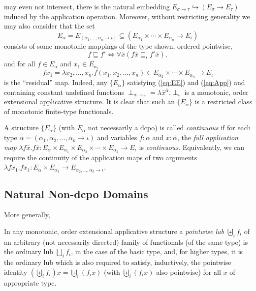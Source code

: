 \documentclass[fleqn]{LMCS}
\theoremstyle{plain}\newtheorem{satz}[thm]{Satz}
\theoremstyle{plain}\newtheorem{hyp}[thm]{Hypothesis}
\theoremstyle{plain}\newtheorem{hyps}[thm]{Hypotheses}
\theoremstyle{definition}\newtheorem{note}[thm]{Note}
\newcommand{\setof}[1]{\{#1\}}
\newcommand{\pointwiselub}{\biguplus}
\newcommand{\arr}{\rightarrow}
\newcommand{\embed}{\hookrightarrow}
\newcommand{\Basictype}{\iota}
\newcommand{\Undef}{{\perp}}
\newcommand{\bx}{\bar{x}}
\newcommand{\?}{\mbox{?}}
\begin{document}
may even not intersect, 
there is the natural embedding $E_{\sigma\arr\tau}\embed (E_\sigma\arr E_\tau)$ 
induced by the application operation. 
Moreover, without restricting generality we may also consider that the set
\begin{equation}\label{eq:EE}
E_{\alpha} = E_{(\alpha_1,\ldots,\alpha_n \arr \Basictype)}
\subseteq
(E_{\alpha_1}\times\cdots\times E_{\alpha_n}\arr E_{\Basictype}) 
\end{equation}
consists of some monotonic mappings of the type shown, ordered pointwise, 
\[
f\sqsubseteq f'\iff\forall\bx(f\bx\sqsubseteq_\iota f'\bx), 
\]
and for all $f\in E_{\alpha}$ and $x_1\in E_{\alpha_1}$ 
\begin{equation}\label{eq:App}
fx_1=
\lambda x_2,\ldots,x_n.f(x_1,x_2,\ldots,x_n) \in
E_{\alpha_2}\times\cdots\times E_{\alpha_n}\arr E_{\Basictype} 
\end{equation}
is the ``residual'' map. 
Indeed, any $\setof{E_{\alpha}}$ satisfying (\ref{eq:EE}) 
and (\ref{eq:App}) and containing constant undefined functions 
$\Undef_{\bar{\alpha}\arr\iota}=\lambda \bx^{\bar{\alpha}}.\Undef_{\iota}$ 
is a monotonic, order extensional applicative structure.  
It is clear that such an $\setof{E_{\alpha}}$ is a restricted 
class of monotonic finite-type functionals. 
\begin{defi}\label{def:continuous-structure}A structure $\setof{E_\alpha}$ (with $E_\alpha$ not necessarily a dcpo) 
is called \emph{continuous} 
if for each type $\alpha=(\alpha_1,\alpha_2,\ldots,\alpha_k\arr\iota)$ 
and variables $f:\alpha$ and $\bx:\bar{\alpha}$, the \emph{full application map} 
$
\lambda f\bx.f\bx:
E_{\alpha}\times E_{\alpha_1}\times E_{\alpha_2}\times\cdots\times E_{\alpha_k}\arr E_{\iota}
$
is \emph{{continuous}}. 
Equivalently, we can require the continuity 
of the application maps of two arguments 
$
\lambda fx_1.fx_1:
E_{\alpha}\times E_{\alpha_1}\arr E_{\alpha_2,\ldots,\alpha_k\arr\iota}
$. 
\end{defi}
\label{page:continuity}

\subsection{Natural Non-dcpo Domains}\label{sec:natural}

\noindent
More generally, 
\begin{defi}In any monotonic, order extensional applicative structure 
a \emph{pointwise lub} 
$\pointwiselub_i f_i$ of an arbitrary 
(not necessarily directed) family of functionals (of the same type) is the ordinary 
lub $\bigsqcup_i f_i$, in the case of the basic type, and, for higher types, it is  
the ordinary lub
which is also required to satisfy, inductively, the pointwise identity 
$(\pointwiselub_i f_i)x=\pointwiselub_i (f_i x)$ 
(with $\pointwiselub_i (f_i x)$ also pointwise)
for all $x$ of appropriate type.
\end{defi}
\end{document}
